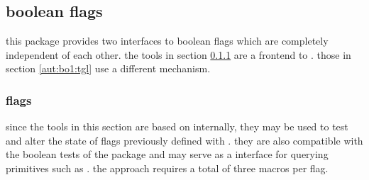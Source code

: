 \subsection{boolean flags}
\label{aut:bol}

this package provides two interfaces to boolean flags which are completely independent of each other. the tools in section \ref{aut:bo1:bol} are a \latex frontend to . those in section \ref{aut:bo1:tgl} use a different mechanism.

\subsubsection{\tex flags}
\label{aut:bo1:bol}

since the tools in this section are based on  internally, they may be used to test and alter the state of flags previously defined with . they are also compatible with the boolean tests of the  package and may serve as a \latex interface for querying \tex primitives such as . the  approach requires a total of three macros per flag.

